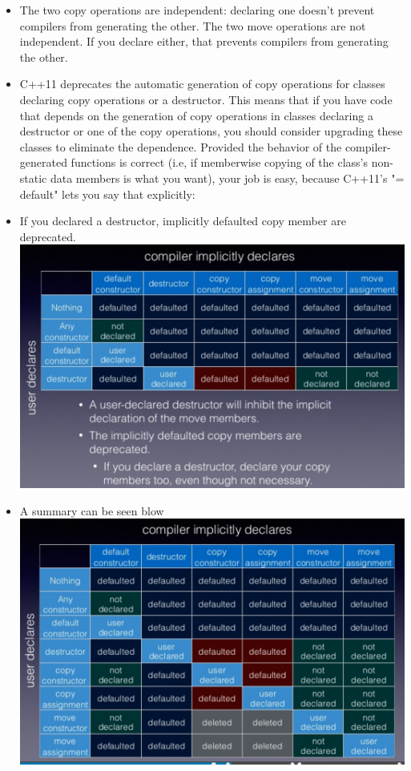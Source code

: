 \documentclass[a4paper,11pt,twoside]{book}
\begin{document}
\begin{itemize}
\item The two copy operations are independent: declaring one doesn't prevent compilers
from generating the other. The two move operations are not independent. If you declare either, that prevents compilers from generating the other.

\item C++11 deprecates the automatic generation of copy operations for classes declaring
copy operations or a destructor. This means that if you have code that depends on
the generation of copy operations in classes declaring a destructor or one of the copy
operations, you should consider upgrading these classes to eliminate the dependence.
Provided the behavior of the compiler-generated functions is correct (i.e, if memberwise
copying of the class's non-static data members is what you want), your job is
easy, because C++11's "= default" lets you say that explicitly:

\item If you declared a destructor, implicitly defaulted copy member are deprecated.  \\
\includegraphics[scale=0.6]{pics/sm4.png} \newline


\item A summary can be seen blow \\
\includegraphics[scale=0.6]{pics/sm3.png} \newline

\end{itemize}
\end{document}
